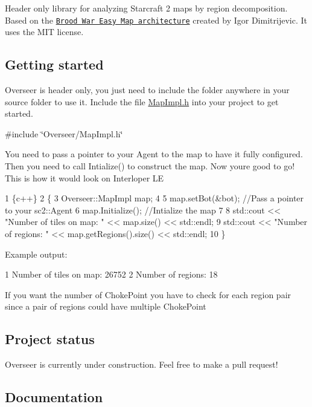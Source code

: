 \href{#features}{\tt }

Header only library for analyzing Starcraft 2 maps by region decomposition. Based on the \href{http://bwem.sourceforge.net/}{\tt Brood War Easy Map architecture} created by Igor Dimitrijevic. It uses the M\+IT license.

\subsection*{Getting started}

Overseer is header only, you just need to include the folder anywhere in your source folder to use it. Include the file {\ttfamily \hyperlink{MapImpl_8h_source}{Map\+Impl.\+h}} into your project to get started.

{\ttfamily \#include \char`\"{}\+Overseer/\+Map\+Impl.\+h\char`\"{}}

You need to pass a pointer to your Agent to the map to have it fully configured. Then you need to call {\ttfamily Intialize()} to construct the map. Now you\textquotesingle{}re good to go! This is how it would look on Interloper LE


\begin{DoxyCode}
1 \{c++\}
2 \{
3     Overseer::MapImpl map;
4 
5     map.setBot(&bot); //Pass a pointer to your sc2::Agent
6     map.Initialize(); //Intialize the map
7 
8     std::cout << "Number of tiles on map: " << map.size() << std::endl;
9     std::cout << "Number of regions: " << map.getRegions().size() << std::endl;
10 \}
\end{DoxyCode}


Example output\+:


\begin{DoxyCode}
1 Number of tiles on map: 26752
2 Number of regions: 18
\end{DoxyCode}


If you want the number of {\ttfamily Choke\+Point} you have to check for each region pair since a pair of regions could have multiple {\ttfamily Choke\+Point} \subsection*{Project status}

Overseer is currently under construction. Feel free to make a pull request!

\subsection*{Documentation}

